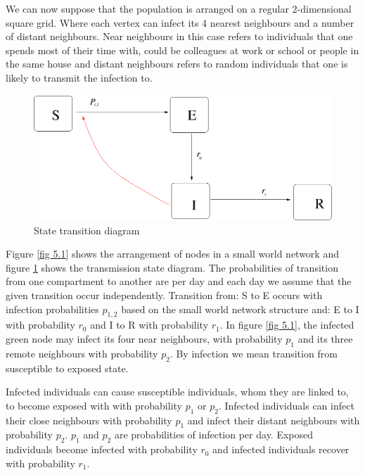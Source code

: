 We  can now suppose that the population is arranged on a regular
2-dimensional square grid.  Where each vertex can infect its 4 nearest neighbours and a number of distant neighbours. Near neighbours in this case refers to individuals that one spends most of their time with, could be colleagues at work or school or people in the same house and distant neighbours refers to random individuals that one is likely to transmit the infection to. 
 
 \begin{figure}[h]
 \centering
 \includegraphics[scale=0.5]{images/swseir.png}
 \caption{State transition diagram} \label{fig 5.2}
\end{figure}

 
Figure \ref{fig 5.1} shows the arrangement of nodes in a small world network and figure \ref{fig 5.2} shows the transmission state diagram. The probabilities of transition from one compartment to another are per day and each day we assume that the given transition occur independently. Transition from: S to E
occurs
with infection probabilities $p_ {1,2} $ based on the small world network structure and: E to I with probability $r_0$ and I to R with probability $r_1$. In figure \ref{fig 5.1}, the infected green node may infect its four near neighbours, with probability $p_1$ and its three remote neighbours with probability $p_2$. By infection we mean transition from susceptible to exposed state. 

Infected individuals can cause susceptible individuals, whom they are linked to, to become exposed with with probability $p_1$ or $p_2$. Infected individuals can  infect their close neighbours with  probability $p_1$ and infect their distant neighbours with probability $p_2$. $p_1 $ and $p_2$ are probabilities of infection per day. Exposed individuals become infected with probability $r_0$ and infected individuals recover with probability $r_1$.

